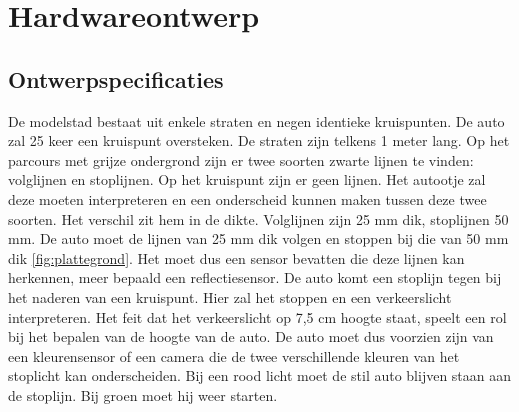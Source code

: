 \documentclass[a4paper,twoside,kulak]{kulakreport} %
\begin{document}
\section{Hardwareontwerp} \label{Hardwareontwerp}

\subsection{Ontwerpspecificaties} \label{Ontwerpspecificaties}


De modelstad bestaat uit enkele straten en negen identieke kruispunten. De auto zal 25 keer een kruispunt oversteken. De straten zijn telkens 1 meter lang. Op het parcours met grijze ondergrond zijn er twee soorten zwarte lijnen te vinden: volglijnen en stoplijnen. Op het kruispunt zijn er geen lijnen. Het autootje zal deze moeten interpreteren en een onderscheid kunnen maken tussen deze twee soorten. Het verschil zit hem in de dikte. Volglijnen zijn 25 mm dik, stoplijnen 50 mm. De auto moet de lijnen van 25 mm dik volgen en stoppen bij die van 50 mm dik \ref{fig:plattegrond}. Het moet dus een sensor bevatten die deze lijnen kan herkennen, meer bepaald een reflectiesensor. De auto komt een stoplijn tegen bij het naderen van een kruispunt. Hier zal het stoppen en een verkeerslicht interpreteren. Het feit dat het verkeerslicht op 7,5 cm hoogte staat, speelt een rol bij het bepalen van de hoogte van de auto. De auto moet dus voorzien zijn van een kleurensensor of een camera die de twee verschillende kleuren van het stoplicht kan onderscheiden. Bij een rood licht moet de stil auto blijven staan aan de stoplijn. Bij groen moet hij weer starten. 
\end{document}
